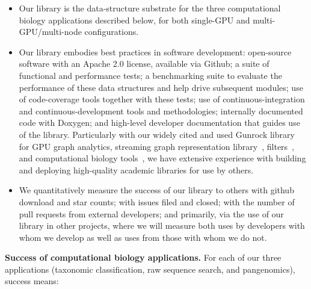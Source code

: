 \begin{itemize}[leftmargin=*,noitemsep]
  \item Our library is the data-structure substrate for the three computational biology applications described below, for both single-GPU and multi-GPU/multi-node configurations.
  \item Our library embodies best practices in software development: open-source software with an Apache 2.0 license, available via Github; a suite of functional and performance tests; a benchmarking suite to evaluate the performance of these data structures and help drive subsequent modules; use of code-coverage tools together with these tests; use of continuous-integration and continuous-development tools and methodologies; internally documented code with Doxygen; and high-level developer documentation that guides use of the library. Particularly with our widely cited and used Gunrock library~\cite{Wang:2017:GGG} for GPU graph analytics, streaming graph representation library~\cite{pandey2021terrace}, filters~\cite{PandeyBJP17,PandeyCoDu21}, and computational biology tools~\cite{PandeyBJP17a,PandeyBJP17b,PandeyABFJP18Cell,pandey2021variantstore}, we have extensive experience with building and deploying high-quality academic libraries for use by others. 
  \item We quantitatively measure the success of our library to others with github download and star counts; with issues filed and closed; with the number of pull requests from external developers; and primarily, via the use of our library in other projects, where we will measure both uses by developers with whom we develop as well as uses from those with whom we do not.
\end{itemize}

\noindent\textbf{Success of computational biology applications.}
For each of our three applications (taxonomic classification, raw sequence search, and pangenomics), success means:

